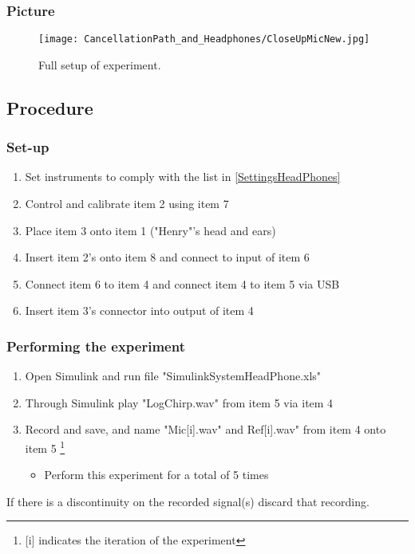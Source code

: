 \subsubsection{Picture}
\begin{figure}[H]
	\centering
	\texttt{[image: CancellationPath\_and\_Headphones/CloseUpMicNew.jpg]}
	\caption{Full setup of experiment.}
	\label{CloseupCancellationPath}
\end{figure}


\subsection{Procedure}
\subsubsection{Set-up}
\begin{enumerate}
	\item Set instruments to comply with the list in \ref{SettingsHeadPhones}
	\item Control and calibrate item 2 using item 7
	\item Place item 3 onto item 1 ("Henry"'s head and ears)
	\item Insert item 2's onto item 8 and connect to input of item 6
	\item Connect item 6 to item 4 and connect item 4 to item 5 via USB
	\item Insert item 3's connector into output of item 4
\end{enumerate}

\subsubsection{Performing the experiment}
\begin{enumerate}
	\item Open Simulink\textsuperscript{\textregistered} and run file "SimulinkSystemHeadPhone.xls"
	\item Through Simulink\textsuperscript{\textregistered} play "LogChirp.wav" from item 5 via item 4
	\item Record and save, and name "Mic[i].wav" and Ref[i].wav" from item 4 onto item 5 \footnote{[i] indicates the iteration of the experiment}
	\begin{itemize}
		\item[] Perform this experiment for a total of 5 times
	\end{itemize}
\end{enumerate}
If there is a discontinuity  on the recorded signal(s) discard that recording.

